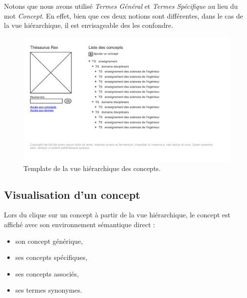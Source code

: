 Notons que nous avons utilisé \emph{Termes Général} et \emph{Termes Spécifique} au lieu du mot \emph{Concept}. En effet, bien que ces deux notions sont différentes, dans le cas de la vue hiérarchique, il est envisageable des les confondre.
\begin{figure}[H]
\begin{center}
\includegraphics[width=\textwidth]{files/template_concepts}
\end{center}
\caption{Template de la vue hiérarchique des concepts.}
\end{figure}

\subsection{Visualisation d'un concept}

Lors du clique sur un concept à partir de la vue hiérarchique, le concept est affiché avec son environnement sémantique direct :
\begin{itemize}
\item son concept générique,
\item ses concepts spécifiques,
\item ses concepts associés,
\item ses termes synonymes.
\end{itemize}

